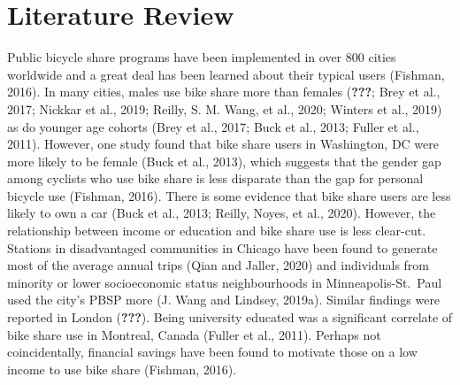\documentclass[]{elsarticle} %
\begin{document}
\hypertarget{literature-review}{%
\section{Literature Review}\label{literature-review}}

Public bicycle share programs have been implemented in over 800 cities
worldwide and a great deal has been learned about their typical users
(Fishman, 2016). In many cities, males use bike share more than females
({\textbf{???}}; Brey et al., 2017; Nickkar et al., 2019; Reilly, S. M.
Wang, et al., 2020; Winters et al., 2019) as do younger age cohorts
(Brey et al., 2017; Buck et al., 2013; Fuller et al., 2011). However,
one study found that bike share users in Washington, DC were more likely
to be female (Buck et al., 2013), which suggests that the gender gap
among cyclists who use bike share is less disparate than the gap for
personal bicycle use (Fishman, 2016). There is some evidence that bike
share users are less likely to own a car (Buck et al., 2013; Reilly,
Noyes, et al., 2020). However, the relationship between income or
education and bike share use is less clear-cut. Stations in
disadvantaged communities in Chicago have been found to generate most of
the average annual trips (Qian and Jaller, 2020) and individuals from
minority or lower socioeconomic status neighbourhoods in
Minneapolis-St.~Paul used the city's PBSP more (J. Wang and Lindsey,
2019a). Similar findings were reported in London ({\textbf{???}}). Being
university educated was a significant correlate of bike share use in
Montreal, Canada (Fuller et al., 2011). Perhaps not coincidentally,
financial savings have been found to motivate those on a low income to
use bike share (Fishman, 2016).
\end{document}
